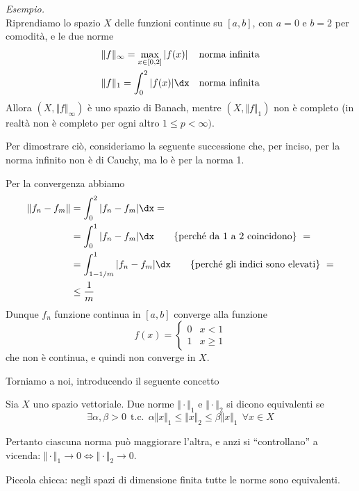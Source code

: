 \textit{Esempio.}\\
Riprendiamo lo spazio $X$ delle funzioni continue su $[a,b]$, con $a=0$ e $b=2$ per comodità, e le due norme 
\begin{align*}
&\Vert f \Vert_\infty =\max_{x\in[0,2]} |f(x)| &\text{norma infinita} \\
&\Vert f \Vert_1 =\int_0^2 |f(x)| \dx &\text{norma infinita}
\end{align*}
Allora $\left(X,\Vert f \Vert_\infty\right)$ è uno spazio di Banach, mentre $\left(X,\Vert f \Vert_1\right)$ non è completo (in realtà non è completo per ogni altro $1\leq p<\infty)$.

Per dimostrare ciò, consideriamo la seguente successione
che, per inciso, per la norma infinito non è di Cauchy, ma lo è per la norma 1. 

\newpage

Per la convergenza abbiamo
\begin{align*}
\Vert f_n-f_m \Vert&=\int_0^2|f_n-f_m|\dx = \\
&=\int_0^1 |f_n-f_m|\dx \qquad \{\text{perché da 1 a 2 coincidono} \}\ = \\
&=\int_{1-1/m}^1|f_n-f_m|\dx \qquad \{\text{perché gli indici sono elevati} \}\ = \\
&\leq \frac{1}{m}
\end{align*}
Dunque $f_n$ funzione continua in $[a,b]$ converge alla funzione
\begin{equation*}
f(x)=\begin{cases}
0 & x<1 \\
1 & x\geq 1
\end{cases}
\end{equation*}
che non è continua, e quindi non converge in $X$.

Torniamo a noi, introducendo il seguente concetto
\begin{defn}
Sia $X$ uno spazio vettoriale. Due norme $\Vert\cdot\Vert_1$ e $\Vert\cdot\Vert_2$ si dicono equivalenti se
\begin{equation*}
\exists \alpha,\beta>0\ \ \text{t.c.}\ \ \alpha\Vert x\Vert_1\leq \Vert x\Vert_2 \leq \beta\Vert x\Vert_1\ \ \forall x\in X
\end{equation*}
\end{defn}

Pertanto ciascuna norma può maggiorare l'altra, e anzi si ``controllano'' a vicenda: $\Vert\cdot\Vert_1\to 0\Leftrightarrow\Vert\cdot\Vert_2\to 0$.

Piccola chicca: negli spazi di dimensione finita tutte le norme sono equivalenti.

